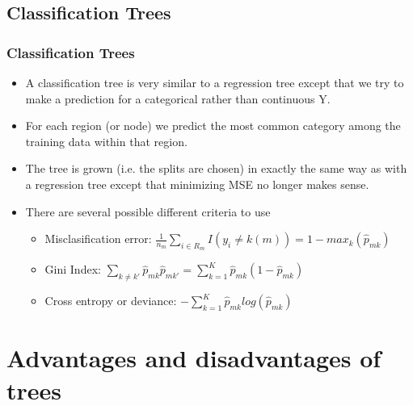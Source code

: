 \documentclass[
  shownotes,
  xcolor={svgnames},
  hyperref={colorlinks,citecolor=DarkBlue,linkcolor=DarkRed,urlcolor=DarkBlue}
  ]{beamer}
\begin{document}
\subsection{Classification Trees}
\begin{frame}[fragile]
\frametitle{Classification Trees}

\begin{itemize}
\item A classification tree is very similar to a regression tree except that we try to make a prediction for a categorical rather than continuous Y.
\medskip
\item For each region (or node) we predict the most common category among the training data within that region.
\medskip
\item The tree is grown (i.e. the splits are chosen) in exactly the same way as with a regression tree except that minimizing MSE no longer makes sense.
\medskip
\item There are several possible different criteria to use %
\begin{itemize}
  \item Misclasification error: $\frac{1}{n_m}\sum_{i\in R_m} I(y_i \neq k(m))=1-max_k (\hat{p}_{mk})$
  \item Gini Index: $\sum_{k\neq k'}\hat{p}_{mk}\hat{p}_{mk'}=\sum_{k=1}^K \hat{p}_{mk}(1-\hat{p}_{mk})$
  \item Cross entropy or deviance: $- \sum_{k=1}^K \hat{p}_{mk}log(\hat{p}_{mk})$
\end{itemize}
\end{itemize}


\end{frame}
\section{Advantages and disadvantages of trees}
\end{document}
